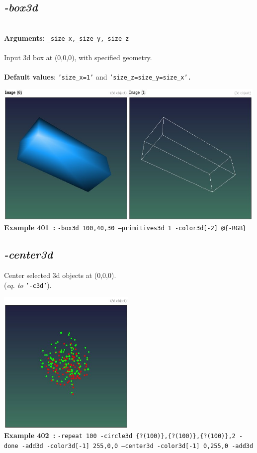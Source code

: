 \documentclass[a4paper,11pt,twoside]{book}
\begin{document}
\subsection{\emph{-box3d} }\vspace*{-0.5em}
~\\\textbf{Arguments: } 
{\small \texttt{\_size\_x,\_size\_y,\_size\_z}}\\~\\
Input 3d box at (0,0,0), with specified geometry.
~\\~\\\textbf{Default values}: {\small \texttt{'size\_x=1'} and \texttt{'size\_z=size\_y=size\_x'.}}
\begin{center}\includegraphics[keepaspectratio=true,height=7cm,width=\textwidth]{img/gmic_def401.jpg}\\
{\footnotesize \textbf{Example 401~:} \texttt{-box3d 100,40,30 --primitives3d 1 -color3d[-2] @\{-RGB\}}}
\end{center}

\subsection{\emph{-center3d} }\vspace*{-0.5em}
Center selected 3d objects at (0,0,0).
~\\(\emph{eq. to} {\small \texttt{'-c3d'}}).
\begin{center}\includegraphics[keepaspectratio=true,height=7cm,width=\textwidth]{img/gmic_def402.jpg}\\
{\footnotesize \textbf{Example 402~:} \texttt{-repeat 100 -circle3d \{?(100)\},\{?(100)\},\{?(100)\},2 -done -add3d -color3d[-1] 255,0,0 --center3d -color3d[-1] 0,255,0 -add3d}}
\end{center}
\end{document}

